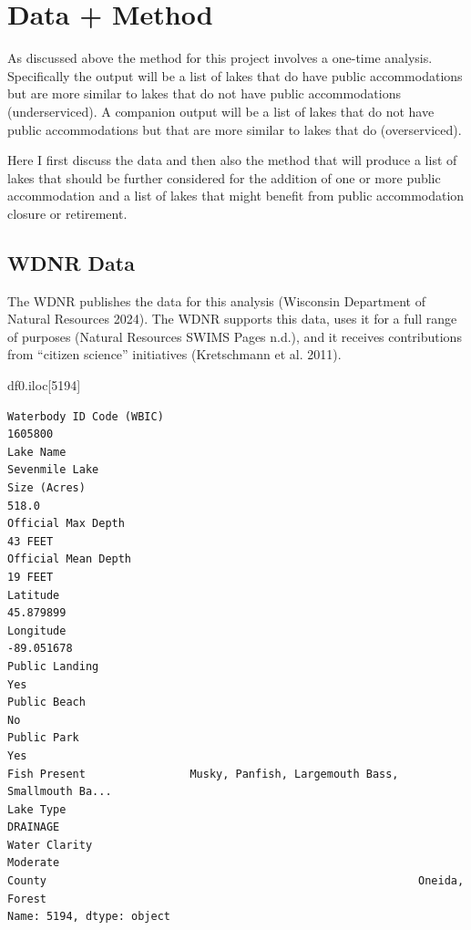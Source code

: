 \documentclass[
]{article}
\newenvironment{Shaded}{\begin{snugshade}}{\end{snugshade}}
\newcommand{\DecValTok}[1]{\textcolor[rgb]{0.68,0.00,0.00}{#1}}
\newcommand{\NormalTok}[1]{\textcolor[rgb]{0.00,0.23,0.31}{#1}}
\begin{document}
\section{Data + Method}\label{data-method}

As discussed above the method for this project involves a one-time
analysis. Specifically the output will be a list of lakes that do have
public accommodations but are more similar to lakes that do not have
public accommodations (underserviced). A companion output will be a list
of lakes that do not have public accommodations but that are more
similar to lakes that do (overserviced).

Here I first discuss the data and then also the method that will produce
a list of lakes that should be further considered for the addition of
one or more public accommodation and a list of lakes that might benefit
from public accommodation closure or retirement.

\subsection{WDNR Data}\label{sec-wdnr-data}

The WDNR publishes the data for this analysis (Wisconsin Department of
Natural Resources 2024). The WDNR supports this data, uses it for a full
range of purposes (Natural Resources SWIMS Pages n.d.), and it receives
contributions from ``citizen science'' initiatives (Kretschmann et al.
2011).

\begin{Shaded}
\begin{Highlighting}[]
\NormalTok{df0.iloc[}\DecValTok{5194}\NormalTok{]}
\end{Highlighting}
\end{Shaded}

\begin{verbatim}
Waterbody ID Code (WBIC)                                              1605800
Lake Name                                                      Sevenmile Lake
Size (Acres)                                                            518.0
Official Max Depth                                                    43 FEET
Official Mean Depth                                                   19 FEET
Latitude                                                            45.879899
Longitude                                                          -89.051678
Public Landing                                                            Yes
Public Beach                                                               No
Public Park                                                               Yes
Fish Present                Musky, Panfish, Largemouth Bass, Smallmouth Ba...
Lake Type                                                            DRAINAGE
Water Clarity                                                        Moderate
County                                                         Oneida, Forest
Name: 5194, dtype: object
\end{verbatim}
\end{document}
